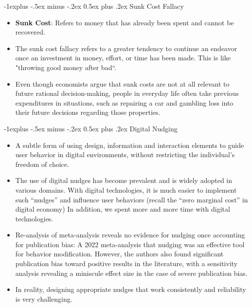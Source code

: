 \documentclass[12pt, landscape]{article}
\makeatletter
\renewcommand{\subsection}{\@startsection{subsection}{2}{0mm}%
                                {-1explus -.5ex minus -.2ex}%
                                {0.5ex plus .2ex}%
                                {\normalfont\normalsize\bfseries}}
\makeatother
\begin{document}
\begin{multicols*}{3}
\subsection{Sunk Cost Fallacy}
\begin{itemize}
\item \textbf{Sunk Cost}: Refers to money that has already been spent and cannot be recovered.
\item The sunk cost fallacy refers to a greater tendency to continue an endeavor once an investment in money, effort, or time has been made. This is like "throwing good money after bad“.
\item Even though economists argue that sunk costs are not at all relevant to future rational decision-making, people in everyday life often take previous expenditures in situations, such as repairing a car and gambling loss into their future decisions regarding those properties.
\end{itemize}
\subsection{Digital Nudging}
\begin{itemize}
\item A subtle form of using design, information and interaction elements to guide user behavior in digital environments, without restricting the individual's freedom of choice.
\item The use of digital nudges has become prevalent and is widely adopted in various domains. With digital technologies, it is much easier to implement such “nudges” and influence user behaviors (recall the “zero marginal cost” in digital economy) In addition, we spent more and more time with digital technologies.
\item Re-analysis of meta-analysis reveals no evidence for nudging once accounting for publication bias: A 2022 meta-analysis that nudging was an effective tool for behavior modification. However, the authors also found significant publication bias toward positive results in the literature, with a sensitivity analysis revealing a miniscule effect size in the case of severe publication bias.
\item In reality, designing appropriate nudges that work consistently and reliability is very challenging.
\end{itemize}

\end{multicols*}
\end{document}
